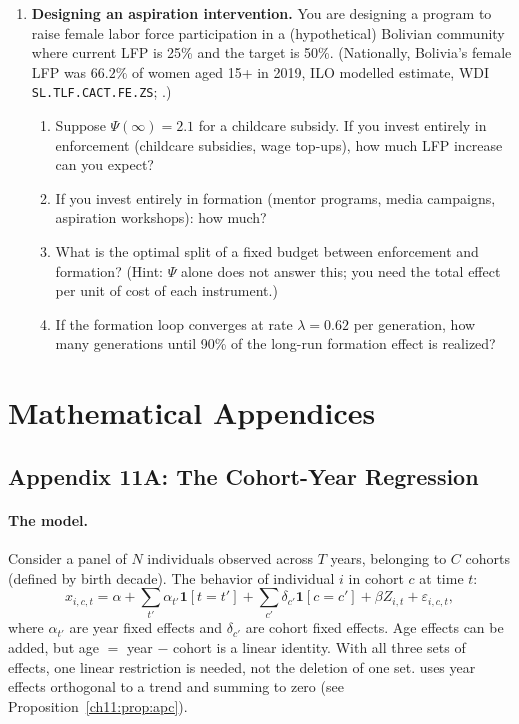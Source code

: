 \documentclass[../structural_economics_book.tex]{subfiles}
\begin{document}
\begin{enumerate}[label=\textbf{11.\arabic*}, leftmargin=3em]
\item \textbf{Designing an aspiration intervention.} You are designing a program to raise female labor force participation in a (hypothetical) Bolivian community where current LFP is 25\% and the target is 50\%. (Nationally, Bolivia's female LFP was $66.2\%$ of women aged 15+ in 2019, ILO modelled estimate, WDI \texttt{SL.TLF.CACT.FE.ZS}; \citealt{worldbank2026wdi}.)
\begin{enumerate}
\item Suppose $\Psi(\infty) = 2.1$ for a childcare subsidy. If you invest entirely in enforcement (childcare subsidies, wage top-ups), how much LFP increase can you expect?
\item If you invest entirely in formation (mentor programs, media campaigns, aspiration workshops): how much?
\item What is the optimal split of a fixed budget between enforcement and formation? (Hint: $\Psi$ alone does not answer this; you need the total effect per unit of cost of each instrument.)
\item If the formation loop converges at rate $\lambda = 0.62$ per generation, how many generations until 90\% of the long-run formation effect is realized?
\end{enumerate}
\end{enumerate}


\newpage
\section*{Mathematical Appendices}


\subsection*{Appendix 11A: The Cohort-Year Regression}
\label{ch11:app:cohort_year}

\paragraph{The model.} Consider a panel of $N$ individuals observed across $T$ years, belonging to $C$ cohorts (defined by birth decade). The behavior of individual $i$ in cohort $c$ at time $t$:
\begin{equation}
x_{i,c,t} = \alpha + \sum_{t'} \alpha_{t'} \mathbf{1}[t = t'] + \sum_{c'} \delta_{c'} \mathbf{1}[c = c'] + \beta Z_{i,t} + \varepsilon_{i,c,t},
\end{equation}
where $\alpha_{t'}$ are year fixed effects and $\delta_{c'}$ are cohort fixed effects. Age effects can be added, but age $=$ year $-$ cohort is a linear identity. With all three sets of effects, one linear restriction is needed, not the deletion of one set. \citet[\S2.7]{deaton1997analysis} uses year effects orthogonal to a trend and summing to zero (see Proposition~\ref{ch11:prop:apc}).
\end{document}
